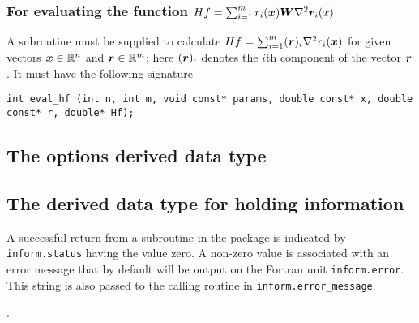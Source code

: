 \documentclass{spec}
\begin{document}


\subsubsection{For evaluating the function $Hf = \sum_{i=1}^m r_i({\bm x}) {\bm W}  \nabla^2 {\bm r}_i(x)$}
A subroutine must be supplied to calculate $Hf = \sum_{i=1}^m ({\bm r})_i \nabla^2 r_i({\bm x})$ for given vectors ${\bm x} \in \mathbb{R}^n$ and ${\bm r} \in \mathbb{R}^m$; here \(({\bm r})_i\) denotes the $i$th component of the vector ${\bm r}$.  
It must have the following signature

\begin{verbatim}
int eval_hf (int n, int m, void const* params, double const* x, double const* r, double* Hf);
\end{verbatim}






\subsection{The options derived data type}
\label{typeoptions}



\subsection{The derived data type for holding information}
\label{typeinform}




\hslerrors

A successful return from a subroutine in the package is indicated by
{\tt inform.status} having the value zero.
A non-zero value is associated with an error message that by default will
be output on the Fortran unit {\tt inform.error}.  This string is also passed to the 
calling routine in {\tt inform.error\_message}.



\hslgeneral

.

\hslmethod
\label{method}



\hslexample




\end{document}
